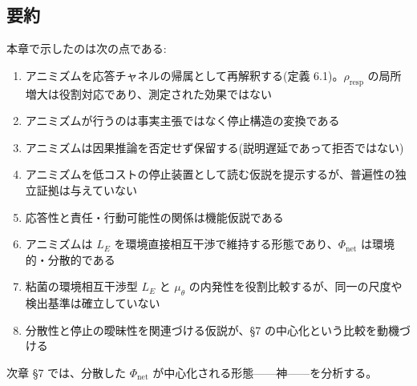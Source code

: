 \bigskip


\subsection{要約}


本章で示したのは次の点である:

\begin{enumerate}
\item アニミズムを応答チャネルの帰属として再解釈する(定義 6.1)。$\rho_{\text{resp}}$ の局所増大は役割対応であり、測定された効果ではない
\item アニミズムが行うのは事実主張ではなく停止構造の変換である
\item アニミズムは因果推論を否定せず保留する(説明遅延であって拒否ではない)
\item アニミズムを低コストの停止装置として読む仮説を提示するが、普遍性の独立証拠は与えていない
\item 応答性と責任・行動可能性の関係は機能仮説である
\item アニミズムは $L_E$ を環境直接相互干渉で維持する形態であり、$\Phi_{\text{net}}$ は環境的・分散的である
\item 粘菌の環境相互干渉型 $L_E$ と $\mu_\theta$ の内発性を役割比較するが、同一の尺度や検出基準は確立していない
\item 分散性と停止の曖昧性を関連づける仮説が、\S{}7 の中心化という比較を動機づける
\end{enumerate}


次章 \S{}7 では、分散した $\Phi_{\text{net}}$ が中心化される形態——神——を分析する。

\bigskip

